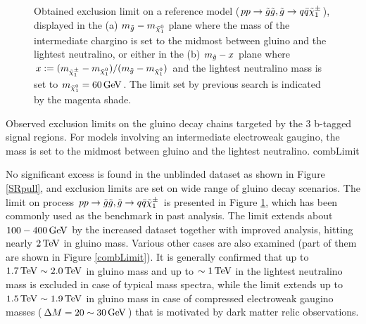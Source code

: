 \documentclass {article}
\begin{document}
\begin{figure}[h]
  \centering
    \caption{ Obtained exclusion limit on a reference model ($pp \rightarrow \tilde{g}\tilde{g},  \tilde{g} \rightarrow q\bar{q} \tilde{\chi}_{1}^{\pm}$), displayed in the
  (a) $m_{\tilde{g}}-m_{\tilde{\chi}_{1}^{0}}$ plane where the mass of the intermediate chargino is set to the midmost between gluino and the lightest neutralino, or either in the
  (b) $m_{\tilde{g}}-x$ plane where $x:= (m_{\tilde{\chi}_{1}^{\pm}}-m_{\tilde{\chi}_{1}^{0}})/(m_{\tilde{g}}-m_{\tilde{\chi}_{1}^{0}})$ and the lightest neutralino mass is set to $m_{\tilde{\chi}_{1}^{0}}=60\, \mathrm{GeV}$. 
  The limit set by previous search \cite{2016ICHEP} is indicated by the magenta shade.
  \label{limit_symQQC1} }
\end{figure}


{Observed exclusion limits on the gluino decay chains targeted by the 3 b-tagged signal regions. 
For models involving an intermediate electroweak gaugino, the mass is set to the midmost between gluino and the lightest neutralino.}
{combLimit}

No significant excess is found in the unblinded dataset as shown in Figure \ref{SRpull}, and exclusion limits are set on wide range of gluino decay scenarios. 
The limit on process $pp \rightarrow \tilde{g}\tilde{g},  \tilde{g} \rightarrow q\bar{q} \tilde{\chi}_{1}^{\pm}$ is presented in Figure \ref{limit_symQQC1}, which has been commonly used as the benchmark in past analysis.
The limit extends about $100-400\, \mathrm{GeV}$ by the increased dataset together with improved analysis, hitting nearly $2\, \mathrm{TeV}$ in gluino mass. 
Various other cases are also examined (part of them are shown in Figure \ref{combLimit}).
It is generally confirmed that up to $1.7\, \mathrm{TeV} \sim 2.0 \, \mathrm{TeV}$ in gluino mass and up to $\sim 1\, \mathrm{TeV}$ in the lightest neutralino mass is excluded in case of typical mass spectra, 
while the limit extends up to $1.5\, \mathrm{TeV} \sim 1.9 \, \mathrm{TeV}$ in gluino mass in case of compressed electroweak gaugino masses ($\Delta M = 20 \sim 30\, \mathrm{GeV}$) that is motivated by dark matter relic observations.
\end{document}
